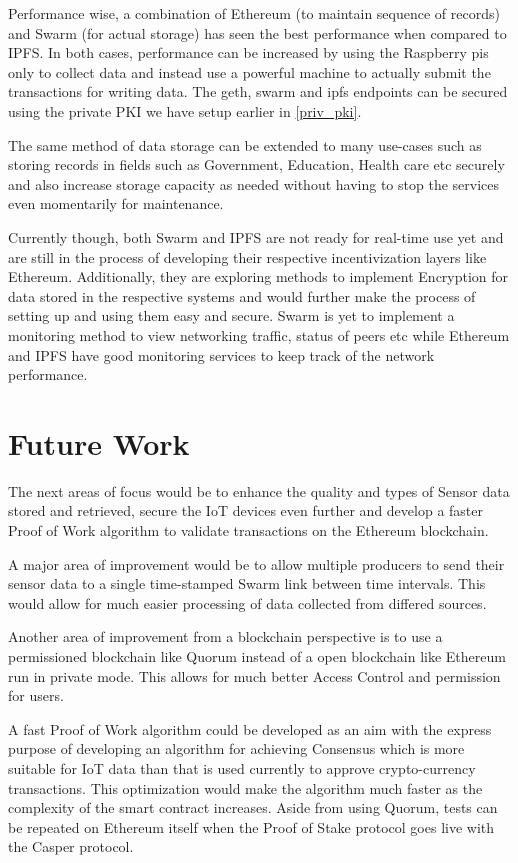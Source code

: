 \documentclass[11pt,openright]{report}
\begin{document}
Performance wise, a combination of Ethereum (to maintain sequence of records) and Swarm (for actual storage) has seen the best performance when compared to IPFS. In both cases, performance can be increased by using the Raspberry pis only to collect data and instead use a powerful machine to actually submit the transactions for writing data. The geth, swarm and ipfs endpoints can be secured using the private PKI we have setup earlier in \ref{priv_pki}.

The same method of data storage can be extended to many use-cases such as storing records in fields such as Government, Education, Health care etc securely and also increase storage capacity as needed without having to stop the services even momentarily for maintenance.

Currently though, both Swarm and IPFS are not ready for real-time use yet and are still in the process of developing their respective incentivization layers \cite{ethersphere2016sw3} like Ethereum. Additionally, they are exploring methods to implement Encryption for data stored in the respective systems and would further make the process of setting up and using them easy and secure. Swarm is yet to implement a monitoring method to view networking traffic, status of peers etc while Ethereum and IPFS have good monitoring services to keep track of the network performance.

\section{Future Work}
The next areas of focus would be to enhance the quality and types of Sensor data stored and retrieved, secure the IoT devices even further and develop a faster Proof of Work algorithm to validate transactions on the Ethereum blockchain. 

A major area of improvement would be to allow multiple producers to send their sensor data to a single time-stamped Swarm link between time intervals. This would allow for much easier processing of data collected from differed sources.

Another area of improvement from a blockchain perspective is to use a permissioned blockchain like Quorum\cite{quorum} instead of a open blockchain like Ethereum run in private mode. This allows for much better Access Control and permission for users.

A fast Proof of Work algorithm could be developed as an aim with the express purpose of developing an algorithm for achieving Consensus which is more suitable for IoT data than that is used currently to approve crypto-currency transactions. This optimization would make the algorithm much faster as the complexity of the smart contract increases. Aside from using Quorum, tests can be repeated on Ethereum itself when the Proof of Stake protocol goes live with the Casper protocol.
\end{document}
